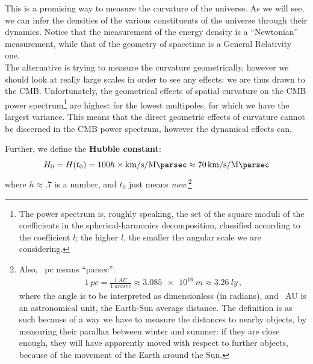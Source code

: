 \documentclass[main.tex]{subfiles}
\begin{document}
This is a promising way to measure the curvature of the universe. As we will see, we can infer the densities of the various constituents of the universe through their dynamics. Notice that the measurement of the energy density is a ``Newtonian'' measurement, while that of the geometry of spacetime is a General Relativity one.\\
The alternative is trying to measure the curvature geometrically, however we should look at really large scales in order to see any effects: we are thus drawn to the CMB. 
Unfortunately, the geometrical effects of spatial curvature on the CMB power spectrum\footnote{The power spectrum is, roughly speaking, the set of the square moduli of the coefficients in the spherical-harmonics decomposition, classified according to the coefficient \(l\); the higher \(l\), the smaller the angular scale we are considering.} are highest for the lowest multipoles, for which we have the largest variance.
This means that the direct geometric effects of curvature cannot be discerned in the CMB power spectrum, however the dynamical effects can. 


Further, we define the \textbf{Hubble constant}:
\begin{equation}
  H_0 = H(t_0) = 100 h \times \SI{}{\kilo\metre\per\second\per\mega\parsec}
  \approx \SI{70}{\kilo\metre\per\second\per\mega\parsec}
\end{equation}
%
where \(h \approx \num{.7}\) is a number, and \(t_0\) just means \emph{now}.\footnote{Also, \SI{}{pc} means ``parsec'': 
%
\begin{align}
\SI{1}{pc} = \frac{\SI{1}{AU}}{\SI{1}{arcsec}}
\approx \SI{3.085e+16}{m}
\approx \SI{3.26}{ly}
\,,
\end{align}
%
where the angle is to be interpreted as dimensionless (in radians), and \SI{}{AU} is an astronomical unit, the Earth-Sun average distance. 
The definition is as such because of a way we have to measure the distances to nearby objects, by measuring their parallax between winter and summer: if they are close enough, they will have apparently moved with respect to further objects, because of the movement of the Earth around the Sun.}
\end{document}
